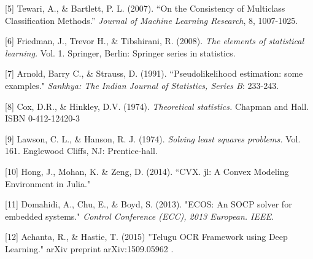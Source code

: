 \documentclass{article}
\begin{document}
[5] Tewari, A., \& Bartlett, P. L. (2007). ``On the Consistency of Multiclass Classification Methods.''
\emph{Journal of Machine Learning Research}, 8, 1007-1025.

[6] Friedman, J., Trevor H., \& Tibshirani, R. (2008). \emph{The elements
of statistical learning.} Vol. 1. Springer, Berlin: Springer series in
statistics.

[7] Arnold, Barry C., \& Strauss, D.  (1991). ``Pseudolikelihood estimation: some examples." \emph{Sankhya: The Indian Journal of Statistics, Series B}: 233-243.

[8] Cox, D.R., \& Hinkley, D.V. (1974). \emph{Theoretical statistics.} Chapman and Hall. ISBN 0-412-12420-3

[9] Lawson, C. L., \& Hanson, R. J. (1974). \emph{Solving least squares problems.} Vol. 161. Englewood Cliffs, NJ: Prentice-hall.

[10] Hong, J., Mohan, K. \& Zeng, D. (2014). ``CVX. jl: A Convex Modeling Environment in Julia."

[11] Domahidi, A., Chu, E., \& Boyd, S. (2013). "ECOS: An SOCP solver for embedded systems." \emph{Control Conference (ECC), 2013 European. IEEE.}

[12] Achanta, R., \& Hastie, T. (2015) "Telugu OCR Framework using Deep Learning." arXiv preprint arXiv:1509.05962 .
\end{document}
